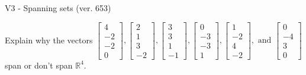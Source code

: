\begin{exercise}
  \begin{exerciseTitle}V3 - Spanning sets (ver. 653)\end{exerciseTitle}
  \begin{exerciseStatement}
    Explain why the vectors \(\left[\begin{array}{r}
4 \\
-2 \\
-2 \\
0
\end{array}\right] , \left[\begin{array}{r}
2 \\
1 \\
3 \\
-2
\end{array}\right] , \left[\begin{array}{r}
3 \\
3 \\
1 \\
-1
\end{array}\right] , \left[\begin{array}{r}
0 \\
-3 \\
-3 \\
1
\end{array}\right] , \left[\begin{array}{r}
1 \\
-2 \\
4 \\
-2
\end{array}\right] , \text{ and } \left[\begin{array}{r}
0 \\
-4 \\
3 \\
0
\end{array}\right]\) span or don't span \(\mathbb{R}^4\). 
	



\end{exerciseStatement}
\end{exercise}

